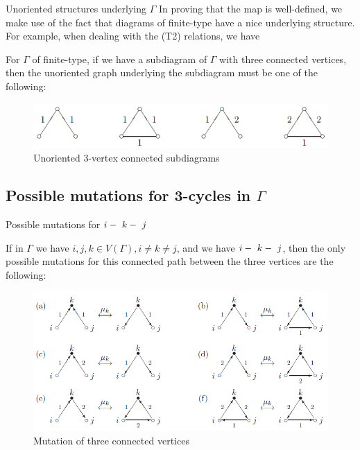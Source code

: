\documentclass{beamer}
\begin{document}
\begin{frame}{Unoriented structures underlying $\Gamma$}
In proving that the map is well-defined, we make use of the fact that diagrams of finite-type have a nice underlying structure. For example, when dealing with the (T2) relations, we have
\begin{lemma}
For $\Gamma$ of finite-type, if we have a subdiagram of $\Gamma$ with three connected vertices, then the unoriented graph underlying the subdiagram must be one of the following:
\begin{figure}[h]
\centering
\includegraphics[scale = .65]{3vertconnected.PNG}
\caption{Unoriented 3-vertex connected subdiagrams}
\end{figure}
\end{lemma}

\end{frame}
\subsection{Possible mutations for 3-cycles in $\Gamma$}

\begin{frame}{Possible mutations for $i\--\ k\--\ j$}
\begin{corollary}
If in $\Gamma$ we have $i,j,k \in V(\Gamma), i \neq k \neq j$, and we have $i\--\ k\--\ j$, then the only possible mutations for this connected path between the three vertices are the following:
\begin{figure}[h]
\centering
\includegraphics[scale = .40]{mutation3path.PNG}
\caption{Mutation of three connected vertices}
\end{figure}
\end{corollary}
\end{frame}
\end{document}
